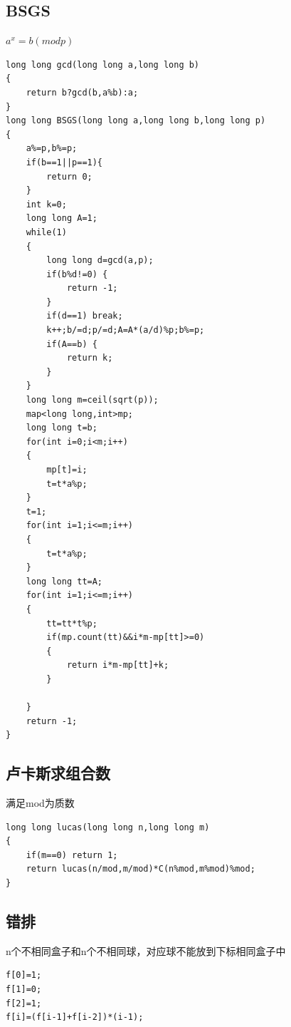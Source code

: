 \documentclass[12pt, a4paper, oneside]{ctexart}
\begin{document}
\newpage 
\subsection{BSGS} 
${a^x=b(mod p)}$
\begin{lstlisting}
long long gcd(long long a,long long b)
{
	return b?gcd(b,a%b):a;
}
long long BSGS(long long a,long long b,long long p)
{
	a%=p,b%=p;
	if(b==1||p==1){
		return 0;
	}
	int k=0;
	long long A=1;
	while(1)
	{
		long long d=gcd(a,p);
		if(b%d!=0) {
			return -1;
		}
		if(d==1) break;
		k++;b/=d;p/=d;A=A*(a/d)%p;b%=p;
		if(A==b) {
			return k;
		}
	}
	long long m=ceil(sqrt(p));
	map<long long,int>mp;
	long long t=b;
	for(int i=0;i<m;i++)
	{
		mp[t]=i;
		t=t*a%p;
	}
	t=1;
	for(int i=1;i<=m;i++)
	{
		t=t*a%p;
	}
	long long tt=A;
	for(int i=1;i<=m;i++)
	{
		tt=tt*t%p;
		if(mp.count(tt)&&i*m-mp[tt]>=0)
		{
			return i*m-mp[tt]+k;
		}
		
	}
	return -1;
}
\end{lstlisting}

\newpage 
\subsection{卢卡斯求组合数} 
满足mod为质数
\begin{lstlisting}
long long lucas(long long n,long long m)
{
	if(m==0) return 1;
	return lucas(n/mod,m/mod)*C(n%mod,m%mod)%mod;
}
\end{lstlisting}

\subsection{错排} 
n个不相同盒子和n个不相同球，对应球不能放到下标相同盒子中
\begin{lstlisting}
f[0]=1;
f[1]=0;
f[2]=1;
f[i]=(f[i-1]+f[i-2])*(i-1);
\end{lstlisting}

\newpage 
\end{document}

